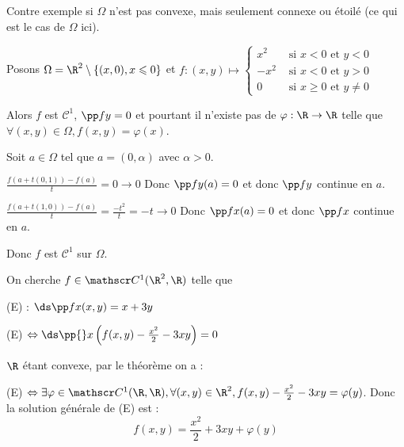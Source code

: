 \begin{exemple}
    Contre exemple si $\Omega$ n'est pas convexe, mais seulement connexe ou étoilé (ce qui est
    le cas de $\Omega$ ici). 

    Posons $\Omega = \R^2 \setminus \{ (x, 0), x \leqslant 0 \} $
    et $f : (x, y) \mapsto \begin{cases}
        x^2 & \text{ si } x < 0 \text{ et } y < 0 \\
        -x^2 & \text{ si } x < 0  \text{ et } y > 0 \\
        0 & \text{ si } x \geqslant 0 \text{ et } y \neq 0 
    \end{cases}$

    Alors $f$ est $\mathscr C^1$, $\displaystyle \pp f y = 0$ et pourtant il n'existe pas de 
    $\varphi : \R \to \R$ telle que $\forall (x, y) \in \Omega, f(x, y) = \varphi(x)$.

    \avspace Soit $a \in \Omega$ tel que $a = (0, \alpha)$ avec $\alpha > 0$. 

    $\displaystyle \frac{f(a +  t(0, 1)) - f(a)}{t } = 0 \to 0$
    Donc $\displaystyle \pp f y (a) = 0$ et donc $\pp f y$ continue en $a$. 

    $\displaystyle \frac{f(a +  t(1, 0)) - f(a)}{t } = \frac{-t^2}{t} = -t \to 0$
    Donc $\displaystyle \pp f x (a) = 0$ et donc $\pp f x$ continue en $a$.

    Donc $f$ est $\mathscr C^1$ sur $\Omega$.
\end{exemple}

\begin{exemple}
    On cherche $f \in \mathscr C^1(\R^2, \R)$ telle que 

    (E) : $\ds \pp f x (x, y) = x + 3 y$

    (E) $ \Leftrightarrow \ds \pp{} x \left( f(x, y) - \frac{x^2} 2 - 3 xy \right) = 0$

    $\R$ étant convexe, par le théorème on a : 

    (E) $ \Leftrightarrow \exists \varphi \in \mathscr C^1(\R, \R), \forall (x, y) \in \R^2, 
    f(x, y) - \frac{x^2} 2 - 3xy = \varphi(y)$. 
    Donc la solution générale de (E) est :
    $$f(x, y) = \frac{x^2} 2 + 3xy + \varphi(y)$$
\end{exemple}

